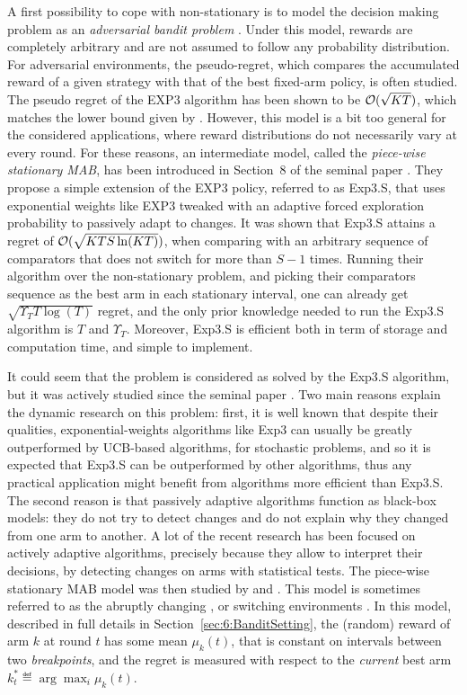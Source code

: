 A first possibility to cope with non-stationary is to model the decision making problem as an \emph{adversarial bandit problem} \cite{Auer02NonStochastic}. Under this model, rewards are completely arbitrary and are not assumed to follow any probability distribution.
For adversarial environments, the pseudo-regret, which compares the accumulated reward of a given strategy with that of the best fixed-arm policy, is often studied. The pseudo regret of the EXP3 algorithm has been shown to be $\mathcal{O}(\sqrt{KT})$, which matches the lower bound given by \cite{Auer02NonStochastic}.
However, this model is a bit too general for the considered applications, where reward distributions do not necessarily vary at every round.
For these reasons, an intermediate model, called the \emph{piece-wise stationary MAB}, has been introduced in Section~8 of the seminal paper \cite{Auer02NonStochastic}.
They propose a simple extension of the EXP3 policy, referred to as Exp3.S, that uses exponential weights like EXP3 tweaked with an adaptive forced exploration probability to passively adapt to changes.
It was shown that Exp3.S attains a regret of $\mathcal{O}(\sqrt{K T S \ln(K T)})$, when comparing with an arbitrary sequence of comparators that does not switch for more than $S-1$ times.
Running their algorithm over the non-stationary problem, and picking their comparators sequence as the best arm in each stationary interval, one can already get $\sqrt{\Upsilon_T T \log(T)}$ regret, and the only prior knowledge needed to run the Exp3.S algorithm is $T$ and $\Upsilon_T$. Moreover, Exp3.S is efficient both in term of storage and computation time, and simple to implement.

It could seem that the problem is considered as solved by the Exp3.S algorithm, but it was actively studied since the seminal paper \cite{Auer02NonStochastic}.
Two main reasons explain the dynamic research on this problem:
first, it is well known that despite their qualities, exponential-weights algorithms like Exp3 can usually be greatly outperformed by UCB-based algorithms, for stochastic problems, and so it is expected that Exp3.S can be outperformed by other algorithms, thus any practical application might benefit from algorithms more efficient than Exp3.S.
%
The second reason is that passively adaptive algorithms function as black-box models: they do not try to detect changes and do not explain why they changed from one arm to another. A lot of the recent research has been focused on actively adaptive algorithms, precisely because they allow to interpret their decisions, by detecting changes on arms with statistical tests.
The piece-wise stationary MAB model was then studied by \cite{Kocsis06} and \cite{YuMannor09}.
%
This model is sometimes referred to as the abruptly changing \cite{WeiSrivastava18Abruptly}, or switching environments \cite{MellorShapiro13}.
%
In this model, described in full details in Section~\ref{sec:6:BanditSetting}, the (random) reward of arm $k$ at round $t$ has some mean $\mu_k(t)$, that is constant on intervals between two \emph{breakpoints}, and the regret is measured with respect to the \emph{current} best arm $k_t^* \eqdef \arg\max_i \mu_k(t)$.

